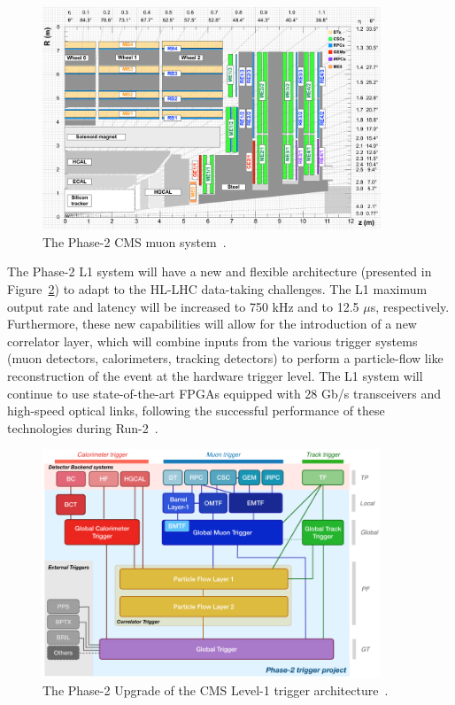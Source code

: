 \begin{figure}[ht!]
\centering
\includegraphics[width=0.9\textwidth]{Figures/Apparatus/cmsphase2upgrade.pdf}
\caption[The Phase-2 CMS muon system]{The Phase-2 CMS muon system~\cite{cmsphase2muons}.}
\label{fig:cmsp2upgrade}
\end{figure}

The Phase-2 L1 system will have a new and flexible architecture (presented in Figure~\ref{fig:cmsl1triggerarchphase2}) to adapt to the HL-LHC data-taking challenges.  The L1 maximum output rate and latency will be increased to 750 kHz and to 12.5 $\mu$s, respectively. Furthermore, these new capabilities will allow for the introduction of a new correlator layer, which will combine inputs from the various trigger systems (muon detectors, calorimeters, tracking detectors) to perform a particle-flow like reconstruction of the event at the hardware trigger level. The L1 system will continue to use state-of-the-art FPGAs equipped with 28 Gb/s transceivers and high-speed optical links, following the successful performance of these technologies during Run-2~\cite{cmsphase1per}.

\begin{figure}[ht!]
\centering
\includegraphics[width=0.9\textwidth]{Figures/Apparatus/cmsl1triggerarchp2.png}
\caption[The Phase-2 Upgrade of the CMS Level-1 trigger architecture]{The Phase-2 Upgrade of the CMS Level-1 trigger architecture~\cite{cmsphase2l1tdr}.}
\label{fig:cmsl1triggerarchphase2}
\end{figure}